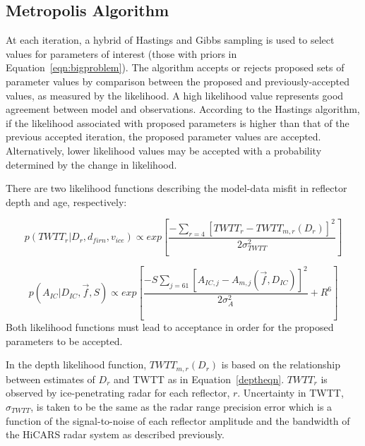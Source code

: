 \subsection{Metropolis Algorithm}\label{metrop}
At each iteration, a hybrid of Hastings and Gibbs sampling \citep{hastings1970,gelfand1992} is used to select values for parameters of interest (those with priors in Equation~\ref{eqn:bigproblem}). The algorithm accepts or rejects proposed sets of parameter values by comparison between the proposed and previously-accepted values, as measured by the likelihood. A high likelihood value represents good agreement between model and observations. According to the Hastings algorithm, if the likelihood associated with proposed parameters is higher than that of the previous accepted iteration, the proposed parameter values are accepted. Alternatively, lower likelihood values may be accepted with a probability determined by the change in likelihood.


There are two likelihood functions describing the model-data misfit in reflector depth and age, respectively:

\begin{equation}\label{eqn:loglikedepth}
p(TWTT_r | D_r,d_{firn},v_{ice} ) \propto exp[\frac{-\sum_{r=4}[TWTT_{r} - TWTT_{m,r}(D_r)]^2}{2\sigma_{TWTT}^2}]
\end{equation}

\begin{equation}\label{eqn:loglikeage}
p(A_{IC} | D_{IC},\vec{f},S) \propto exp[\frac{-S\sum_{j = 61}[A_{IC,j} - A_{m,j}(\vec{f},D_{IC})]^2}{2\sigma_A^2} + R^6]
\end{equation}
Both likelihood functions must lead to acceptance in order for the proposed parameters to be accepted.

In the depth likelihood function, $TWTT_{m,r}(D_r)$ is based on the relationship between estimates of $D_r$ and TWTT as in Equation~\ref{deptheqn}. $TWTT_r$ is observed by ice-penetrating radar for each reflector, $r$. Uncertainty in TWTT, $\sigma_{TWTT}$, is taken to be the same as the radar range precision error which is a function of the signal-to-noise of each reflector amplitude and the bandwidth of the HiCARS radar system as described previously.



